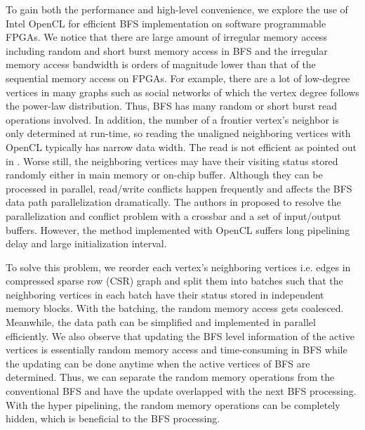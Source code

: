 To gain both the performance and high-level convenience, we explore the use of 
Intel OpenCL for efficient BFS implementation on software programmable FPGAs.
We notice that there are large amount of irregular memory access including 
random and short burst memory access in BFS and the irregular memory access 
bandwidth is orders of magnitude lower than that of the sequential 
memory access on FPGAs. For example, there are a lot of low-degree vertices in many 
graphs such as social networks of which the vertex degree follows the power-law 
distribution. Thus, BFS has many random or short burst read operations involved. In addition, the number of a 
frontier vertex's neighbor is only determined at run-time, so reading the unaligned 
neighboring vertices with OpenCL typically has narrow data width. The read is not efficient 
as pointed out in \cite{wang2017multikernel}. Worse still, the neighboring vertices 
may have their visiting status stored randomly either in main memory or on-chip buffer.
Although they can be processed in parallel, read/write conflicts happen frequently 
and affects the BFS data path parallelization dramatically. 
The authors in \cite{ham2016graphicionado} 
proposed to resolve the parallelization and conflict problem with a 
crossbar and a set of input/output buffers. However, the method implemented 
with OpenCL suffers long pipelining delay and large initialization interval. 

To solve this problem, we reorder each vertex's neighboring vertices i.e. 
edges in compressed sparse row (CSR) graph and split them into 
batches such that the neighboring vertices 
in each batch have their status stored in independent memory blocks. 
With the batching, the random memory access gets coalesced. Meanwhile, 
the data path can be simplified and implemented in parallel efficiently. 
We also observe that updating the BFS level information of the 
active vertices is essentially random memory access and time-consuming 
in BFS while the updating can be done anytime when the active vertices of BFS 
are determined. Thus, we can separate the random memory operations from
the conventional BFS and have the update overlapped with the next BFS processing. 
With the hyper pipelining, the random memory operations can be completely 
hidden, which is beneficial to the BFS processing.

